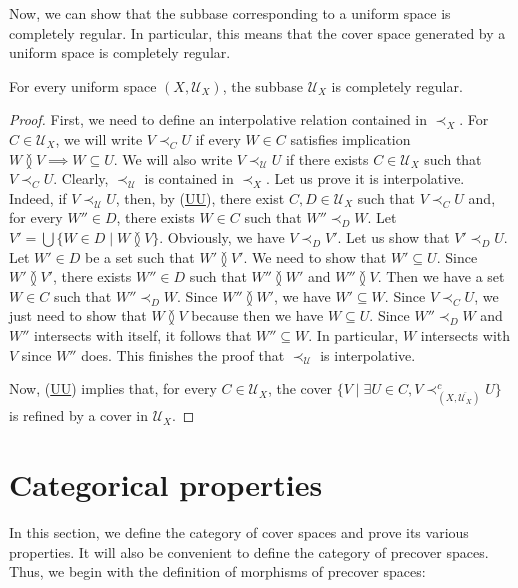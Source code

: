 \documentclass[reqno]{amsart}
\newcommand{\axref}[1]{(\hyperref[ax:#1]{#1})}
\theoremstyle{definition}
\theoremstyle{remark}
\numberwithin{figure}{section}
\newcommand{\overlap}[2]{#1 \between #2}
\newcommand{\rb}{\prec}
\begin{document}
Now, we can show that the subbase corresponding to a uniform space is completely regular.
In particular, this means that the cover space generated by a uniform space is completely regular.

\begin{prop}
For every uniform space $(X,\mathcal{U}_X)$, the subbase $\mathcal{U}_X$ is completely regular.
\end{prop}
\begin{proof}
First, we need to define an interpolative relation contained in $\rb_X$.
For $C \in \mathcal{U}_X$, we will write $V \rb_C U$ if every $W \in C$ satisfies implication $\overlap{W}{V} \implies W \subseteq U$.
We will also write $V \rb_\mathcal{U} U$ if there exists $C \in \mathcal{U}_X$ such that $V \rb_C U$.
Clearly, $\rb_\mathcal{U}$ is contained in $\rb_X$.
Let us prove it is interpolative.
Indeed, if $V \rb_\mathcal{U} U$, then, by \axref{UU}, there exist $C,D \in \mathcal{U}_X$ such that $V \rb_C U$ and, for every $W'' \in D$, there exists $W \in C$ such that $W'' \rb_D W$.
Let $V' = \bigcup \{ W \in D \mid \overlap{W}{V} \}$.
Obviously, we have $V \rb_D V'$.
Let us show that $V' \rb_D U$.
Let $W' \in D$ be a set such that $\overlap{W'}{V'}$.
We need to show that $W' \subseteq U$.
Since $\overlap{W'}{V'}$, there exists $W'' \in D$ such that $\overlap{W''}{W'}$ and $\overlap{W''}{V}$.
Then we have a set $W \in C$ such that $W'' \rb_D W$.
Since $\overlap{W''}{W'}$, we have $W' \subseteq W$.
Since $V \rb_C U$, we just need to show that $\overlap{W}{V}$ because then we have $W \subseteq U$.
Since $W'' \rb_D W$ and $W''$ intersects with itself, it follows that $W'' \subseteq W$.
In particular, $W$ intersects with $V$ since $W''$ does.
This finishes the proof that $\rb_\mathcal{U}$ is interpolative.

Now, \axref{UU} implies that, for every $C \in \mathcal{U}_X$, the cover $\{ V \mid \exists U \in C, V \rb^c_{(X,\overline{\mathcal{U}_X})} U \}$ is refined by a cover in $\mathcal{U}_X$.
\end{proof}

\section{Categorical properties}

In this section, we define the category of cover spaces and prove its various properties.
It will also be convenient to define the category of precover spaces.
Thus, we begin with the definition of morphisms of precover spaces:
\end{document}
